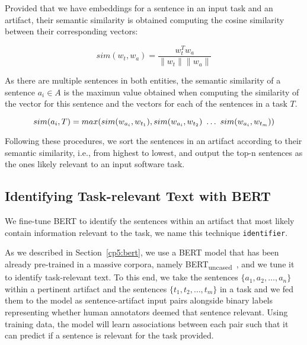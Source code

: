  
 Provided that we have embeddings for a sentence in an input task and an artifact, their semantic similarity is obtained computing the cosine similarity  between their corresponding vectors:


\begin{equation}
    sim(w_t,w_a) = \frac{w_t^Tw_a}{\|w_t\| \|w_a\|}
    \label{eq:word-sim}
\end{equation}
 
\smallskip
 As there are multiple sentences in both entities, the semantic similarity of a sentence $a_i \in A$ is the maximun value obtained when computing the similarity of the vector for this sentence and the vectors for each of the sentences in a task $T$.

 \begin{equation}
    sim(a_i, T) = max(sim(w_{a_i}, w_{t_1}), sim(w_{a_i}, w_{t_2}) ~\dots~ sim(w_{a_i}, w_{t_m})) \\
\end{equation}


Following these procedures, we sort the sentences in an artifact according to their semantic similarity, i.e., from highest to lowest, and output the top-n sentences as the ones likely relevant to an input software task.


\subsection{Identifying Task-relevant Text with BERT}
\label{cp5:approach-bert}



We fine-tune BERT to identify the sentences within an artifact that most likely contain information relevant to the task, we name this technique \texttt{identifier}.



As we described in Section~\ref{cp5:bert}, we use a BERT model that has been already pre-trained in a massive corpora, namely BERT\textsubscript{uncased}~\cite{Devlin2018Bert}, and we tune it to identify task-relevant text.
To this end, we take the sentences $\{a_1, a_2, \dots, a_n\}$ within a pertinent artifact and the sentences $\{t_1, t_2, \dots, t_m\}$ in a task and we fed them to the model as sentence-artifact input pairs 
alongside binary labels representing whether human annotators deemed that sentence relevant. 
Using training data, the model will learn associations between each pair such that it can predict if a sentence is relevant for the task provided. 


